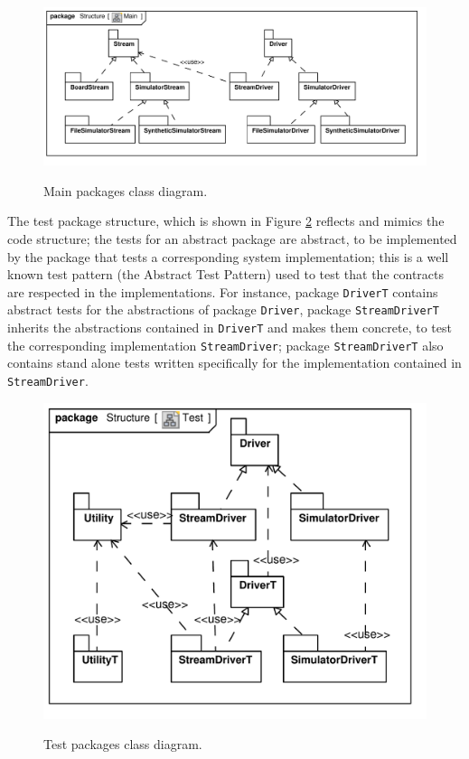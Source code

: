 \documentclass{article} \usepackage{times}
\newcommand{\lil}[1]{\texttt{\lstinline|#1|}}
\begin{document}
\begin{figure}[htb!]
  \centering
  \includegraphics[scale=0.7]{UML_model/Class_Diagram__Structure__Main}
  \label{fig:class_diagram_main}
  \caption{Main packages class diagram.}
\end{figure}

The test package structure, which is shown in Figure
\ref{fig:class_diagram_test} reflects and mimics the code structure;
the tests for an abstract package are abstract, to be implemented by
the package that tests a corresponding system implementation; this is
a well known test pattern (the Abstract Test
Pattern\cite{thomas2004java}) used to test that the contracts are
respected in the implementations.  For instance, package \lil{DriverT}
contains abstract tests for the abstractions of package \lil{Driver},
package \lil{StreamDriverT} inherits the abstractions contained in
\lil{DriverT} and makes them concrete, to test the corresponding
implementation \lil{StreamDriver}; package \lil{StreamDriverT} also
contains stand alone tests written specifically for the implementation
contained in \lil{StreamDriver}.

\begin{figure}[htb!]
  \centering
  \includegraphics[scale=0.4]{UML_model/Class_Diagram__Structure__Test}
  \label{fig:class_diagram_test}
  \caption{Test packages class diagram.}
\end{figure}
\end{document}

